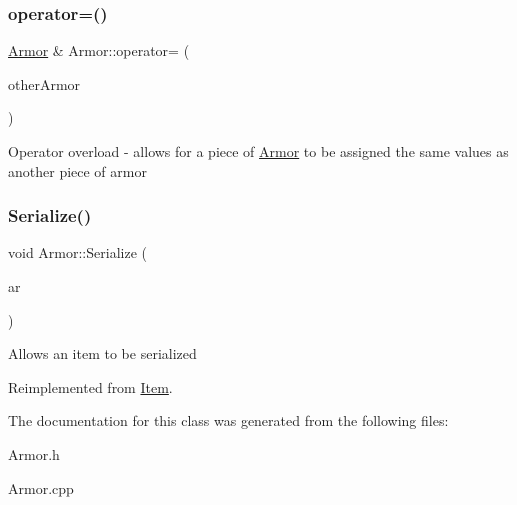 \subsubsection{\texorpdfstring{operator=()}{operator=()}}
{\footnotesize\ttfamily \hyperlink{class_armor}{Armor} \& Armor\+::operator= (\begin{DoxyParamCaption}\item[{const \hyperlink{class_armor}{Armor} $\ast$}]{other\+Armor }\end{DoxyParamCaption})}

Operator overload -\/ allows for a piece of \hyperlink{class_armor}{Armor} to be assigned the same values as another piece of armor \hypertarget{class_armor_a49d9af5d1a2d02e9dbf05d023f4a6515}{}\label{class_armor_a49d9af5d1a2d02e9dbf05d023f4a6515} 
\subsubsection{\texorpdfstring{Serialize()}{Serialize()}}
{\footnotesize\ttfamily void Armor\+::\+Serialize (\begin{DoxyParamCaption}\item[{C\+Archive \&}]{ar }\end{DoxyParamCaption})\hspace{0.3cm}{\ttfamily [virtual]}}

Allows an item to be serialized 

Reimplemented from \hyperlink{class_item_ad1eae21e57fc3ce3252080a4efbfb8e8}{Item}.



The documentation for this class was generated from the following files\+:\begin{DoxyCompactItemize}
\item 
Armor.\+h\item 
Armor.\+cpp\end{DoxyCompactItemize}
